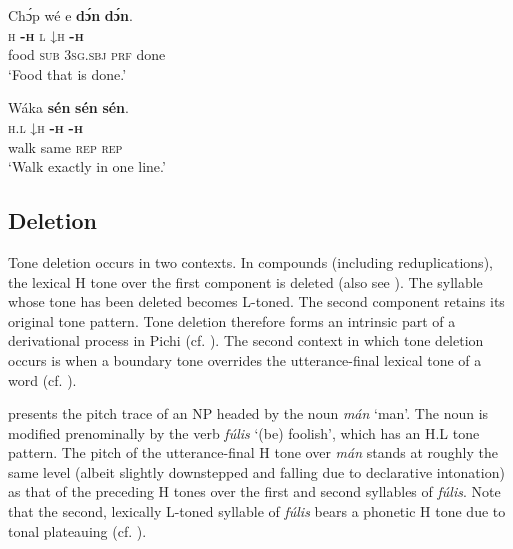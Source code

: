 \ea\label{ex:key:56}
\glll Chɔ́p  wé  e    \textbf{dɔ́n}  \textbf{dɔ́n}.\\
\textsc{h}    \textbf{\textsc{{}-h}}  \textsc{l}    \textsc{↓}\textsc{h}  \textbf{\textsc{{}-h}} \\
food    \textsc{sub}  \textsc{3sg.sbj}  \textsc{prf}  done\\
\glt ‘Food that is done.’
\z

\ea\label{ex:key:57}
\glll   Wáka  \textbf{sén}    \textbf{sén}    \textbf{sén}.\\
\textsc{h.l}    \textsc{↓}\textsc{h}    \textbf{\textsc{{}-h}}    \textbf{\textsc{{}-h}}\\
walk  same  \textsc{rep}    \textsc{rep}\\
\glt ‘Walk exactly in one line.’
\z

\subsection{Deletion}\label{sec:3.2.4}

Tone deletion occurs in two contexts. In compounds (including reduplications), the lexical H tone over the first component is deleted (also see \citealt{Yakpo2012}). The syllable whose tone has been deleted becomes L-toned. The second component retains its original tone pattern. Tone deletion therefore forms an intrinsic part of a derivational process in Pichi (cf. ). The second context in which tone deletion occurs is when a boundary tone overrides the utterance-final lexical tone of a word (cf. ).

 presents the pitch trace of an NP headed by the noun \textit{mán} ‘man’. The noun is modified prenominally by the verb \textit{fúlis} ‘(be) foolish’, which has an H.L tone pattern. The pitch of the utterance-final H tone over \textit{mán} stands at roughly the same level (albeit slightly downstepped and falling due to declarative intonation) as that of the preceding H tones over the first and second syllables of \textit{fúlis}. Note that the second, lexically L-toned syllable of \textit{fúlis} bears a phonetic H tone due to tonal plateauing (cf. ).

